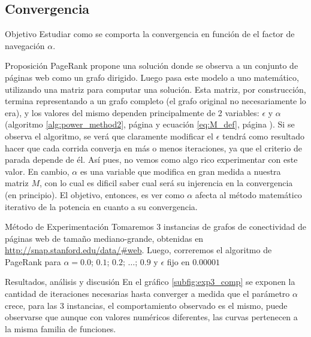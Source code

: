 \subsection{Convergencia}
\label{subsec:exp3}
\begin{LaTeXdescription}
    \item[Objetivo] Estudiar como se comporta la convergencia en funci\'on de
        el factor de navegaci\'on $\alpha$.

    \item[Proposici\'on] PageRank propone una soluci\'on donde se observa a un
        conjunto de p\'aginas web como un grafo dirigido. Luego pasa este modelo
        a uno  matem\'atico, utilizando una matriz para computar una soluci\'on.
        Esta matriz, por construcci\'on, termina representando a un grafo
        completo (el grafo original no necesariamente lo era), y los valores del
        mismo dependen principalmente de 2 variables: $\epsilon$ y $\alpha$
        (algoritmo \ref{alg:power_method2}, p\'agina \pageref{alg:power_method2}
        y ecuaci\'on \ref{eq:M_def}, p\'agina \pageref{eq:M_def}). Si se observa
        el algoritmo, se ver\'a que claramente modificar el $\epsilon$ tendr\'a
        como resultado hacer que cada corrida converja en m\'as o menos
        iteraciones, ya que el criterio de parada depende de \'el. As\'i pues,
        no vemos como algo rico experimentar con este valor. En cambio, $\alpha$
        es una variable que modifica en gran medida a nuestra matriz $M$, con lo
        cual es dificil saber cual ser\'a su injerencia en la convergencia (en
        principio). El objetivo, entonces, es ver como $\alpha$ afecta al
        m\'etodo matem\'atico iterativo de la potencia en cuanto a su
        convergencia.

    \item[M\'etodo de Experimentaci\'on] Tomaremos 3 instancias de grafos de
        conectividad de p\'aginas web de tama\~no mediano-grande, obtenidas en
        \url{http://snap.stanford.edu/data/\#web}. Luego, correremos el
        algoritmo de PageRank para $\alpha=0.0$; $0.1$; $0.2$; $\dots$; $0.9$ y $\epsilon$
        fijo en $0.00001$

    \item[Resultados, an\'alisis y discusi\'on]
    En el gráfico \ref{subfig:exp3_comp} se exponen la cantidad de iteraciones necesarias hasta converger a medida que el parámetro $\alpha$ crece, para las 3 instancias, el comportamiento observado es el mismo, puede observarse que aunque con valores numéricos diferentes, las curvas pertenecen a la misma familia de funciones.\\


\end{LaTeXdescription}
